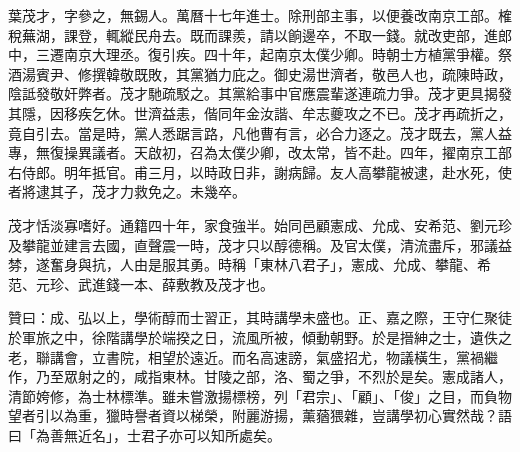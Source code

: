 \begin{pinyinscope}
葉茂才，字參之，無錫人。萬曆十七年進士。除刑部主事，以便養改南京工部。榷稅蕪湖，課登，輒縱民舟去。既而課羨，請以餉邊卒，不取一錢。就改吏部，進郎中，三遷南京大理丞。復引疾。四十年，起南京太僕少卿。時朝士方植黨爭權。祭酒湯賓尹、修撰韓敬既敗，其黨猶力庇之。御史湯世濟者，敬邑人也，疏陳時政，陰詆發敬奸弊者。茂才馳疏駁之。其黨給事中官應震輩遂連疏力爭。茂才更具揭發其隱，因移疾乞休。世濟益恚，偕同年金汝諧、牟志夔攻之不已。茂才再疏折之，竟自引去。當是時，黨人悉踞言路，凡他曹有言，必合力逐之。茂才既去，黨人益專，無復操異議者。天啟初，召為太僕少卿，改太常，皆不赴。四年，擢南京工部右侍郎。明年抵官。甫三月，以時政日非，謝病歸。友人高攀龍被逮，赴水死，使者將逮其子，茂才力救免之。未幾卒。

茂才恬淡寡嗜好。通籍四十年，家食強半。始同邑顧憲成、允成、安希范、劉元珍及攀龍並建言去國，直聲震一時，茂才只以醇德稱。及官太僕，清流盡斥，邪議益棼，遂奮身與抗，人由是服其勇。時稱「東林八君子」，憲成、允成、攀龍、希范、元珍、武進錢一本、薛敷教及茂才也。

贊曰：成、弘以上，學術醇而士習正，其時講學未盛也。正、嘉之際，王守仁聚徒於軍旅之中，徐階講學於端揆之日，流風所被，傾動朝野。於是搢紳之士，遺佚之老，聯講會，立書院，相望於遠近。而名高速謗，氣盛招尤，物議橫生，黨禍繼作，乃至眾射之的，咸指東林。甘陵之部，洛、蜀之爭，不烈於是矣。憲成諸人，清節姱修，為士林標準。雖未嘗激揚標榜，列「君宗」、「顧」、「俊」之目，而負物望者引以為重，獵時譽者資以梯榮，附麗游揚，薰蕕猥雜，豈講學初心實然哉？語曰「為善無近名」，士君子亦可以知所處矣。


\end{pinyinscope}